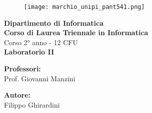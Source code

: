 \begin{titlepage} %
\begin{figure}[t] %
    \centering\texttt{[image: marchio\_unipi\_pant541.png]}
\end{figure}
\vspace{20mm}

\begin{Large}
 \begin{center}
	\textbf{Dipartimento di Informatica\\ Corso di Laurea Triennale in Informatica\\}
	\vspace{20mm}
    {\LARGE{Corso 2° anno - 12 CFU}}\\
	\vspace{10mm}
	{\huge{\bf Laboratorio II}}\\
\end{center}
\end{Large}


\vspace{36mm}
\begin{minipage}[t]{0.47\textwidth}
	{\large{\bf Professori:}\\ \large{Prof. Giovanni Manzini}}
\end{minipage}
\hfill
\begin{minipage}[t]{0.47\textwidth}\raggedleft
	{\large{\bf Autore:}\\ \large{Filippo Ghirardini}}
\end{minipage}

\vspace{25mm}

\hrulefill

\vspace{5mm}


\end{titlepage}